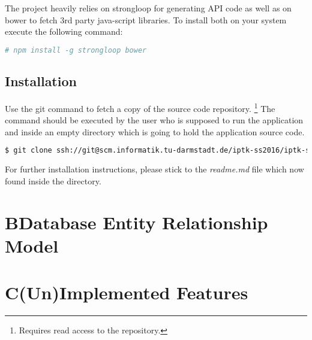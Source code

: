 \documentclass[nochapterpage,nopartpage,noheadingspace,numbersubsubsec,bigchapter,colorback,accentcolor=tud9c,10pt]{tudreport}
\begin{document}
    \noindent The project heavily relies on strongloop for generating API code as well as on bower to fetch 3rd party java-script libraries. To install both on your system execute the following command:
        \begin{lstlisting}[language=bash]
          # npm install -g strongloop bower
        \end{lstlisting}

  \section*{Installation}
  \label{sec:appendix:setup:install}

    \noindent Use the git command to fetch a copy of the source code repository.%
    \footnote{Requires read access to the repository.}
    The command should be executed by the user who is supposed to run the application and inside an empty directory which is going to hold the application source code.
        \begin{lstlisting}[language=bash]
            $ git clone ssh://git@scm.informatik.tu-darmstadt.de/iptk-ss2016/iptk-ss2016-team-whiskey.git .
        \end{lstlisting}
    For further installation instructions, please stick to the \emph{readme.md} file which now found inside the directory.


  \chapter*{B\quad Database Entity Relationship Model}


  \chapter*{C\quad (Un)Implemented Features}

\end{document}
